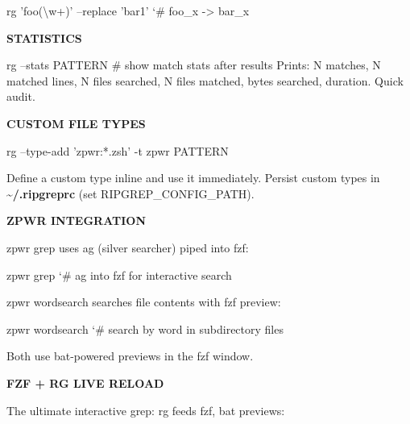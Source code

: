 \documentclass[11pt,a4paper,twoside]{book}
\begin{document}
\begin{codebox}
\color{neongreen}rg 'foo(\textbackslash{}w+)' --replace 'bar1'  {\char`\#} foo\_x -> bar\_x\\
\end{codebox}


\vspace{12pt}
{\bfseries\color{neonyellow} STATISTICS}\vspace{4pt}

rg --stats PATTERN   \# show match stats after results Prints: N matches, N matched lines, N files searched, N files matched, bytes searched, duration. Quick audit.


\vspace{12pt}
{\bfseries\color{neonyellow} CUSTOM FILE TYPES}\vspace{4pt}

\begin{codebox}
\color{neongreen}rg --type-add 'zpwr:*.zsh' -t zpwr PATTERN\\
\end{codebox}

Define a custom type inline and use it immediately. Persist custom types in \textbf{\textasciitilde{}/.ripgreprc} (set RIPGREP\_CONFIG\_PATH).


\vspace{12pt}
{\bfseries\color{neonyellow} \textbf{ZPWR} INTEGRATION}\vspace{4pt}

zpwr grep uses ag (silver searcher) piped into fzf:

\begin{codebox}
\color{neongreen}zpwr grep            {\char`\#} ag into fzf for interactive search\\
\end{codebox}

zpwr wordsearch searches file contents with fzf preview:

\begin{codebox}
\color{neongreen}zpwr wordsearch      {\char`\#} search by word in subdirectory files\\
\end{codebox}

Both use bat-powered previews in the fzf window.


\vspace{12pt}
{\bfseries\color{neonyellow} FZF + RG LIVE RELOAD}\vspace{4pt}

The ultimate interactive grep: rg feeds fzf, bat previews:
\end{document}
